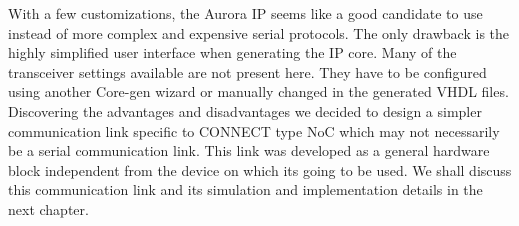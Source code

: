 With a few customizations, the Aurora IP seems like a good candidate to use instead of more complex and expensive serial protocols. The only drawback is the highly simplified user interface when generating the IP core. Many of the transceiver settings available are not present here. They have to be configured using another Core-gen wizard or manually changed in the generated VHDL files. Discovering the advantages and disadvantages we decided to design a simpler communication link specific to CONNECT type NoC which may not necessarily be a serial communication link. This link was developed as a general hardware block independent from the device on which its going to be used. We shall discuss this communication link and its simulation and implementation details in the next chapter.